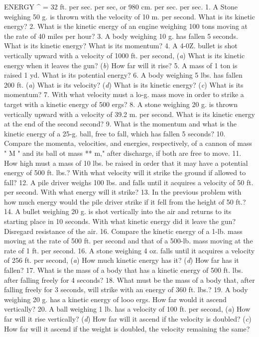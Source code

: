 ENERGY
^ = 32 ft. per sec. per sec, or 980 cm. per sec. per sec.
1. A Stone weighing 50 g. is thrown with the velocity of 10 m. per second. What is its kinetic energy?
2. What is the kinetic energy of an engine weighing 100 tons moving at the rate of 40 miles per hour?
3. A body weighing 10 g. has fallen 5 seconds. What is its kinetic energy? What is its momentum?
4. A 4-0Z. bullet is shot vertically upward with a velocity of 1000 ft. per second, (\emph{a}) What is its kinetic energy when it leaves the gun? (\emph{b}) How far will it rise?
5. A mass of 1 ton is raised 1 yd. What is its potential energy?
6. A body weighing 5 lbs. has fallen 200 ft. (\emph{a}) What is its velocity? (\emph{d}) What is its kinetic energy? (\emph{c}) What is its momentum?
7. With what velocity must a lo-g. mass move in order to strike a target with a kinetic energy of 500 ergs?
8. A stone weighing 20 g. is thrown vertically upward with a velocity of 39.2 m. per second. What is its kinetic energy at the end of the second second?
9. What is the momentum and what is the kinetic energy of a 25-g. ball, free to fall, which has fallen 5 seconds?
10. Compare the momenta, velocities, and energies, respectively, of a cannon of mass " M " and its ball ot mass ** m," after discharge, if both are free to move.
11. How high must a mass of 10 lbs. be raised in order that it may have a potential energy of 500 ft. lbs.? With what velocity will it strike the ground if allowed to fall?
12. A pile driver weighs 100 lbs. and falls until it acquires a velocity of 50 ft. per second. With what energy will it strike?
13. In the previous problem with how much energy would the pile driver strike if it fell from the height of 50 ft.?
14. A bullet weighing 20 g. is shot vertically into the air and returns to its starting place in 10 seconds. With what kinetic energy did it leave the gun? Disregard resistance of the air.
16. Compare the kinetic energy of a 1-lb. mass moving at the rate of 500 ft. per second and that of a 500-lb. mass moving at the rate of 1 ft. per second.
16. A stone weighing 4 oz. falls until it acquires a velocity of 256 ft. per second, (\emph{a}) How much kinetic energy has it? (\emph{d}) How far has it fallen?
17. What is the mass of a body that has a kinetic energy of 500 ft. lbs. after falling freely for 4 seconds?
18. What must be the mass of a body that, after falling freely for 3 seconds, will strike with an energy of 360 ft. lbs.?
19. A body weighing 20 g. has a kinetic energy of looo ergs. How far would it ascend vertically?
20. A ball weighing 1 lb. has a velocity of 100 ft. per second, (\emph{a}) How far will it rise vertically? (\emph{d}) How far will it ascend if the velocity is doubled? (\emph{c}) How far will it ascend if the weight is doubled, the velocity remaining the same?
